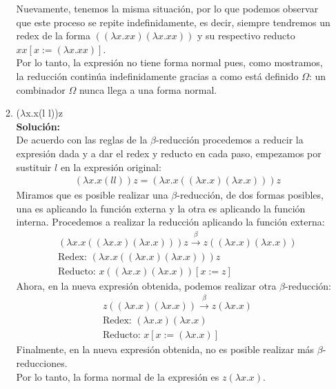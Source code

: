 \documentclass[11pt]{article}
\begin{document}
\begin{enumerate}[leftmargin=0.8cm]
\begin{enumerate}
        Nuevamente, tenemos la misma situación, por lo que podemos observar que este proceso se repite indefinidamente, es decir, siempre tendremos un redex de la forma $((\lambda x.xx)(\lambda x.xx))$ y su respectivo reducto $xx[x:= (\lambda x.xx)]$.\\

        Por lo tanto, la expresión no tiene forma normal pues, como mostramos, la reducción continúa indefinidamente gracias a como está definido $\Omega$: un combinador $\Omega$ nunca llega a una forma normal. 


        \item ($\lambda$x.x(l l))z \\
        \textbf{Solución:}\\
        De acuerdo con las reglas de la $\beta$-reducción procedemos a reducir la expresión dada y a dar el redex y reducto en cada paso, empezamos por sustituir $l$ en la expresión original:
        \begin{align*}
            & (\lambda x.x(l l))z = (\lambda x.x((\lambda x.x)(\lambda x.x)))z
        \end{align*}
        Miramos que es posible realizar una $\beta$-reducción, de dos formas posibles, una es aplicando la función externa y la otra es aplicando la función interna. Procedemos a realizar la reducción aplicando la función externa:
        \begin{align*}
            & (\lambda x.x((\lambda x.x)(\lambda x.x)))z \xrightarrow{\beta} z((\lambda x.x)(\lambda x.x))\\
            & \text{Redex: } (\lambda x.x((\lambda x.x)(\lambda x.x)))z\\
            & \text{Reducto: } x((\lambda x.x)(\lambda x.x))[x:=z]
        \end{align*}
        Ahora, en la nueva expresión obtenida, podemos realizar otra $\beta$-reducción:
        \begin{align*}
            & z((\lambda x.x)(\lambda x.x)) \xrightarrow{\beta} z(\lambda x.x)\\
            & \text{Redex: } (\lambda x.x)(\lambda x.x)\\
            & \text{Reducto: } x[x:= (\lambda x.x)]
        \end{align*}
        Finalmente, en la nueva expresión obtenida, no es posible realizar más $\beta$-reducciones.\\
        Por lo tanto, la forma normal de la expresión es $z(\lambda x.x)$.
        

    \end{enumerate}
\end{enumerate}
\end{document}
